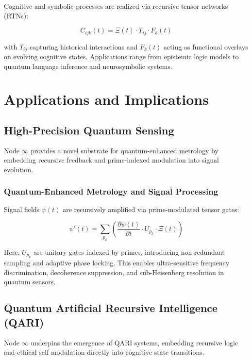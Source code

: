 \documentclass[12pt]{article}
\begin{document}
Cognitive and symbolic processes are realized via recursive tensor networks (RTNs):

\begin{equation}
C_{ijk}(t) = \Xi(t) \cdot T_{ij} \cdot F_k(t)
\end{equation}

with $T_{ij}$ capturing historical interactions and $F_k(t)$ acting as functional overlays on evolving cognitive states. Applications range from epistemic logic models to quantum language inference and neurosymbolic systems.

\section{Applications and Implications}

\subsection{High-Precision Quantum Sensing}

Node \( \infty \) provides a novel substrate for quantum-enhanced metrology by embedding recursive feedback and prime-indexed modulation into signal evolution.

\subsubsection*{Quantum-Enhanced Metrology and Signal Processing}

Signal fields $\psi(t)$ are recursively amplified via prime-modulated tensor gates:

\begin{equation}
\psi'(t) = \sum_{p_k} \left( \frac{\partial \psi(t)}{\partial t} \cdot U_{p_k} \cdot \Xi(t) \right)
\end{equation}

Here, $U_{p_k}$ are unitary gates indexed by primes, introducing non-redundant sampling and adaptive phase locking. This enables ultra-sensitive frequency discrimination, decoherence suppression, and sub-Heisenberg resolution in quantum sensors.

\subsection{Quantum Artificial Recursive Intelligence (QARI)}

Node \( \infty \) underpins the emergence of QARI systems, embedding recursive logic and ethical self-modulation directly into cognitive state transitions.
\end{document}
